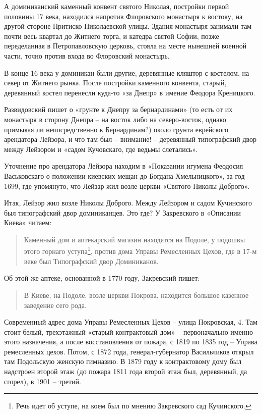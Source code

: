 А доминиканский каменный конвент святого Николая, постройки первой половины 17 века, находился напротив Флоровского монастыря к востоку, на другой стороне Притиско-Николаевской улицы. Здания монастыря занимали там почти весь квартал до Житнего торга, и катедра святой Софии, позже переделанная в Петропавловскую церковь, стояла на месте нынешней военной части, точно против входа во Флоровский монастырь.

В конце 16 века у доминикан были другие, деревянные кляштор с костелом, на север от Житнего рынка. После постройки каменного конвента, старый, деревянный костел перенесли куда-то «за Днепр» в имение Феодора Креницкого.

Развидовский пишет о «грунте к Днепру за бернардинами» (то есть от их монастыря в сторону Днепра – на восток либо на северо-восток, однако примыкая ли непосредственно к Бернардинам?) около грунта еврейского арендатора Лейзора, и что там был – внимание! – деревянный типографский двор между Лейзором и «садом Кучовскаго, где ведьмы слетались». 

Уточнение про арендатора Лейзора находим в «Показании игумена Феодосия Васьковскаго о положении киевских мещан до Богдана Хмельницкого», за год 1699, где упомянуто, что Лейзар жил возле церкви «Святого Николы Доброго».

Итак, Лейзор жил возле Николы Доброго. Между Лейзором и садом Кучинского был типографский двор доминиканцев. Это где? У Закревского в «Описании Киева» читаем\cite{zakr01}:

\begin{quotation}
Каменный дом и аптекарский магазин находятся на Подоле, у подошвы этого горнаго уступа\footnote{Речь идет об уступе, на коем был по мнению Закревского сад Кучинского.}, против дома Управы Ремесленных Цехов, где в 17-м веке был Типографский двор Доминиканов.
\end{quotation}

Об этой же аптеке, основанной в 1770 году, Закревский пишет: 

\begin{quotation}
В Киеве, на Подоле, возле церкви Покрова, находится большое казенное заведение сего рода.
\end{quotation}

Современный адрес дома Управы Ремесленных Цехов – улица Покровская, 4. Там стоит белый, трехэтажный «старый контрактовый дом» – первоначально именно этого назначения, а после восстановления от пожара, с 1819 по 1835 год – Управа ремесленных цехов. Потом, с 1872 года, генерал-губернатор Васильчиков открыл там Подольскую женскую гимназию. В 1879 году к контрактовому дому был надстроен второй этаж (до пожара 1811 года второй этаж был, деревянный, да сгорел), в 1901 – третий. 

